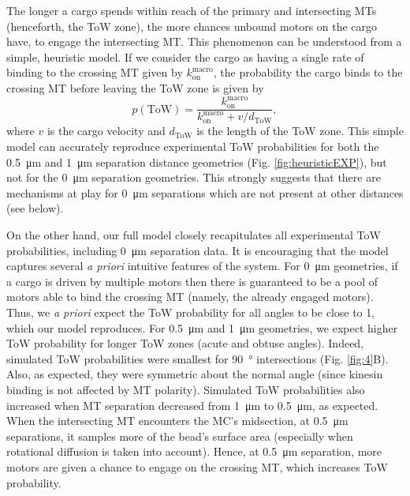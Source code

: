 The longer a cargo spends within reach of the primary and intersecting MTs (henceforth, the ToW zone), the more chances unbound motors on the cargo have, to engage the intersecting MT. This phenomenon can be understood from a simple, heuristic model. If we consider the cargo as having a single rate of binding to the crossing MT given by $k_{\text{on}}^\text{macro}$, the probability the cargo binds to the crossing MT before leaving the ToW zone is given by 
\begin{equation} \label{eq:rate_war}
p(\text{ToW})=\frac{k_{\text{on}}^\text{macro}}{k_{\text{on}}^\text{macro} +  v / d_\text{ToW} },
\end{equation}
where $v$ is the cargo velocity and $d_\text{ToW}$ is the length of the ToW zone. This simple model can accurately reproduce experimental ToW probabilities for both the \SI{.5}{\micro\meter} and \SI{1}{\micro\meter} separation distance geometries (Fig. \ref{fig:heuristicEXP}), but not for the \SI{0}{\micro\meter} separation geometries. This strongly suggests that there are mechanisms at play for \SI{0}{\micro\meter} separations which are not present at other distances (see below).

On the other hand, our full model closely recapitulates all experimental ToW probabilities, including \SI{0}{\micro\meter} separation data. It is encouraging that the model captures several \textit{a priori} intuitive features of the system. For \SI{0}{\micro\meter} geometries, if a cargo is driven by multiple motors then there is guaranteed to be a pool of motors able to bind the crossing MT (namely, the already engaged motors). Thus, we \textit{a priori} expect the ToW probability for all angles to be close to 1, which our model reproduces. For \SI{.5}{\micro\meter} and \SI{1}{\micro\meter} geometries, we expect higher ToW probability for longer ToW zones (acute and obtuse angles). Indeed, simulated ToW probabilities were smallest for \SI{90}{\degree} intersections (Fig. \ref{fig:4}B). Also, as expected, they were symmetric about the normal angle (since kinesin binding is not affected by MT polarity). Simulated ToW probabilities also increased when MT separation decreased from \SI{1}{\micro\meter} to \SI{.5}{\micro\meter}, as expected. When the intersecting MT encounters the MC's midsection, at \SI{.5}{\micro\meter} separations, it samples more of the bead's surface area (especially when rotational diffusion is taken into account). Hence, at \SI{.5}{\micro\meter} separation, more motors are given a chance to engage on the crossing MT, which increases ToW probability.

